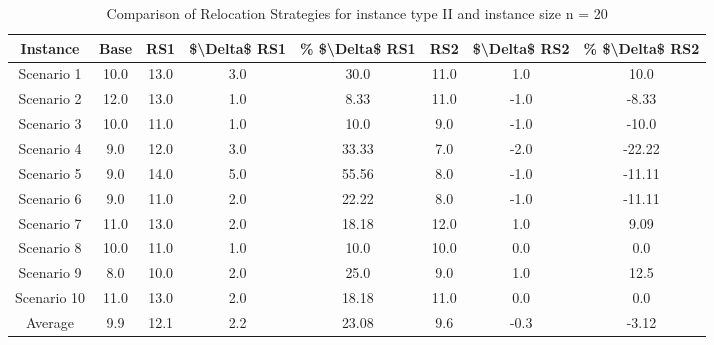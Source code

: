 \begin{table}[H]
\centering
\begin{tabular}{cccccccc}
  \hline
  \textbf{Instance} & \textbf{Base} & \textbf{RS1} & \textbf{\$\textbackslash{}Delta\$  RS1} & \textbf{\% \$\textbackslash{}Delta\$  RS1} & \textbf{RS2} & \textbf{\$\textbackslash{}Delta\$  RS2} & \textbf{\% \$\textbackslash{}Delta\$  RS2} \\\hline
  Scenario 1 & 10.0 & 13.0 & 3.0 & 30.0 & 11.0 & 1.0 & 10.0 \\
  Scenario 2 & 12.0 & 13.0 & 1.0 & 8.33 & 11.0 & -1.0 & -8.33 \\
  Scenario 3 & 10.0 & 11.0 & 1.0 & 10.0 & 9.0 & -1.0 & -10.0 \\
  Scenario 4 & 9.0 & 12.0 & 3.0 & 33.33 & 7.0 & -2.0 & -22.22 \\
  Scenario 5 & 9.0 & 14.0 & 5.0 & 55.56 & 8.0 & -1.0 & -11.11 \\
  Scenario 6 & 9.0 & 11.0 & 2.0 & 22.22 & 8.0 & -1.0 & -11.11 \\
  Scenario 7 & 11.0 & 13.0 & 2.0 & 18.18 & 12.0 & 1.0 & 9.09 \\
  Scenario 8 & 10.0 & 11.0 & 1.0 & 10.0 & 10.0 & 0.0 & 0.0 \\
  Scenario 9 & 8.0 & 10.0 & 2.0 & 25.0 & 9.0 & 1.0 & 12.5 \\
  Scenario 10 & 11.0 & 13.0 & 2.0 & 18.18 & 11.0 & 0.0 & 0.0 \\
  Average & 9.9 & 12.1 & 2.2 & 23.08 & 9.6 & -0.3 & -3.12 \\\hline
\end{tabular}
\caption{Comparison of Relocation Strategies for instance type II and instance size n = 20}
\label{tab:wait:resrelocation-comparison_II_20}
\end{table}
